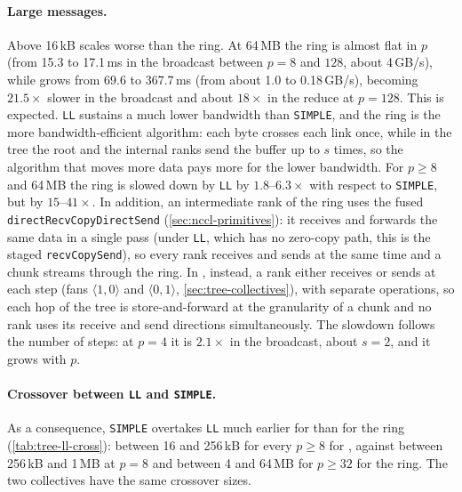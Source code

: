 \paragraph{Large messages.}
Above 16\,kB \bine{} scales worse than the ring.
At 64\,MB the ring is almost flat in $p$ (from 15.3 to 17.1\,ms in the broadcast between $p=8$ and $128$, about 4\,GB/s), while \bine{} grows from 69.6 to 367.7\,ms (from about 1.0 to 0.18\,GB/s), becoming $21.5\times$ slower in the broadcast and about $18\times$ in the reduce at $p=128$.
This is expected.
\texttt{LL} sustains a much lower bandwidth than \texttt{SIMPLE}, and the ring is the more bandwidth-efficient algorithm: each byte crosses each link once, while in the tree the root and the internal ranks send the buffer up to $s$ times, so the algorithm that moves more data pays more for the lower bandwidth.
For $p\ge8$ and 64\,MB the ring is slowed down by \texttt{LL} by $1.8$--$6.3\times$ with respect to \texttt{SIMPLE}, but \bine{} by $15$--$41\times$.
In addition, an intermediate rank of the ring uses the fused \texttt{directRecvCopyDirectSend} (\cref{sec:nccl-primitives}): it receives and forwards the same data in a single pass (under \texttt{LL}, which has no zero-copy path, this is the staged \texttt{recvCopySend}), so every rank receives and sends at the same time and a chunk streams through the ring. In \bine{}, instead, a rank either receives or sends at each step (fans $\langle1,0\rangle$ and $\langle0,1\rangle$, \cref{sec:tree-collectives}), with separate operations, so each hop of the tree is store-and-forward at the granularity of a chunk and no rank uses its receive and send directions simultaneously.
The slowdown follows the number of steps: at $p=4$ it is $2.1\times$ in the broadcast, about $s=2$, and it grows with $p$.

\paragraph{Crossover between \texttt{LL} and \texttt{SIMPLE}.}
As a consequence, \texttt{SIMPLE} overtakes \texttt{LL} much earlier for \bine{} than for the ring (\cref{tab:tree-ll-cross}): between 16 and 256\,kB for every $p\ge8$ for \bine{}, against between 256\,kB and 1\,MB at $p=8$ and between 4 and 64\,MB for $p\ge32$ for the ring.
The two collectives have the same crossover sizes.

